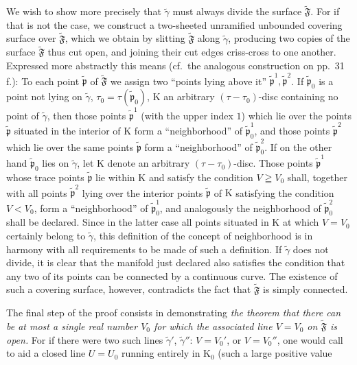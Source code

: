 \documentclass{article}
\begin{document}
We wish to show more precisely that $\tilde{\gamma}$ must always divide the surface $\widetilde{\mathfrak{F}}$. For if that is not the case, we construct a two-sheeted unramified unbounded covering surface over $\widetilde{\mathfrak{F}}$, which we obtain by slitting $\widetilde{\mathfrak{F}}$ along $\tilde{\gamma}$, producing two copies of the surface $\widetilde{\mathfrak{F}}$ thus cut open, and joining their cut edges criss-cross to one another. Expressed more abstractly this means (cf.\ the analogous construction on pp.~31\,f.): To each point $\tilde{\mathfrak{p}}$ of $\widetilde{\mathfrak{F}}$ we assign two ``points lying above it'' $\tilde{\mathfrak{p}}^1, \tilde{\mathfrak{p}}^2$. If $\tilde{\mathfrak{p}}_0$ is a point not lying on $\tilde{\gamma}$, $\tau_0 = \tau(\tilde{\mathfrak{p}}_0)$, $\mathrm{K}$ an arbitrary $(\tau - \tau_0)$-disc containing no point of $\tilde{\gamma}$, then those points $\tilde{\mathfrak{p}}^1$ (with the upper index $1$) which lie over the points $\tilde{\mathfrak{p}}$ situated in the interior of $\mathrm{K}$ form a ``neighborhood'' of $\tilde{\mathfrak{p}}_0^1$, and those points $\tilde{\mathfrak{p}}^2$ which lie over the same points $\tilde{\mathfrak{p}}$ form a ``neighborhood'' of $\tilde{\mathfrak{p}}_0^2$. If on the other hand $\tilde{\mathfrak{p}}_0$ lies on $\tilde{\gamma}$, let $\mathrm{K}$ denote an arbitrary $(\tau - \tau_0)$-disc. Those points $\tilde{\mathfrak{p}}^1$ whose trace points $\tilde{\mathfrak{p}}$ lie within $\mathrm{K}$ and satisfy the condition $V \geqq V_0$ shall, together with all points $\tilde{\mathfrak{p}}^2$ lying over the interior points $\tilde{\mathfrak{p}}$ of $\mathrm{K}$ satisfying the condition $V < V_0$, form a ``neighborhood'' of $\tilde{\mathfrak{p}}_0^1$, and analogously the neighborhood of $\tilde{\mathfrak{p}}_0^2$ shall be declared. Since in the latter case all points situated in $\mathrm{K}$ at which $V = V_0$ certainly belong to $\tilde{\gamma}$, this definition of the concept of neighborhood is in harmony with all requirements to be made of such a definition. If $\tilde{\gamma}$ does not divide, it is clear that the manifold just declared also satisfies the condition that any two of its points can be connected by a continuous curve. The existence of such a covering surface, however, contradicts the fact that $\widetilde{\mathfrak{F}}$ is simply connected.


The final step of the proof consists in demonstrating \emph{the theorem that there can be at most a single real number $V_0$ for which the associated line $V = V_0$ on $\widetilde{\mathfrak{F}}$ is open.} For if there were two such lines $\tilde{\gamma}'$, $\tilde{\gamma}''$: $V = V_0'$, or $V = V_0''$, one would call to aid a closed line $U = U_0$ running entirely in $\mathrm{K}_0$ (such a large positive value
\end{document}
